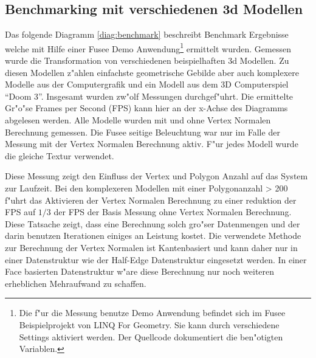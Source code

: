 \documentclass[pagesize, paper=a4, fontsize=12pt,titlepage=true, headings=small, headnosepline, abstractoff, liststotoc, nochapterprefix, plainheadsepline]{scrreprt}
\newcommand{\LFG}{LINQ For Geometry}
\newcommand{\HES}{Half-Edge Datenstruktur }
\begin{document}
\subsection{Benchmarking mit verschiedenen 3d Modellen}
Das folgende Diagramm \ref{diag:benchmark} beschreibt Benchmark Ergebnisse welche mit Hilfe einer Fusee Demo Anwendung\footnote{Die f"ur die Messung benutze Demo Anwendung befindet sich im Fusee Beispielprojekt von \LFG. Sie kann durch verschiedene Settings aktiviert werden. Der Quellcode dokumentiert die ben"otigten Variablen.} ermittelt wurden. Gemessen wurde die Transformation von verschiedenen beispielhaften 3d Modellen. Zu diesen Modellen z"ahlen einfachste geometrische Gebilde aber auch komplexere Modelle aus der Computergrafik und ein Modell aus dem 3D Computerspiel "`Doom 3"'. Insgesamt wurden zw"olf Messungen durchgef"uhrt. Die ermittelte Gr"o"se Frames per Second (FPS) kann hier an der x-Achse des Diagramms abgelesen werden. Alle Modelle wurden mit und ohne Vertex Normalen Berechnung gemessen. Die Fusee seitige Beleuchtung war nur im Falle der Messung mit der Vertex Normalen Berechnung aktiv. F"ur jedes Modell wurde die gleiche Textur verwendet.
\newline

Diese Messung zeigt den Einfluss der Vertex und Polygon Anzahl auf das System zur Laufzeit. Bei den komplexeren Modellen mit einer Polygonanzahl > 200 f"uhrt das Aktivieren der Vertex Normalen Berechnung zu einer reduktion der FPS auf $1/3$ der FPS der Basis Messung ohne Vertex Normalen Berechnung. Diese Tatsache zeigt, dass eine Berechnung solch gro"ser Datenmengen und der darin benutzen Iterationen einiges an Leistung kostet. Die verwendete Methode zur Berechnung der Vertex Normalen ist Kantenbasiert und kann daher nur in einer Datenstruktur wie der \HES eingesetzt werden. In einer Face basierten Datenstruktur w"are diese Berechnung nur noch weiteren erheblichen Mehraufwand zu schaffen.

 \label{diag:benchmark}


\end{document}
